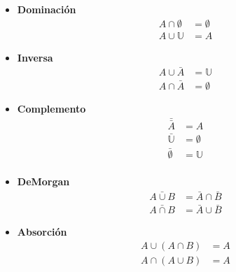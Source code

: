 \begin{itemize}
\item \textbf{Dominación}
\begin{equation}
    \begin{array}{ll}
        A \cap \emptyset & = \emptyset \\
        A \cup \mathbb{U} & = A
    \end{array}
\end{equation}

\item \textbf{Inversa}
\begin{equation}
    \begin{array}{ll}
        A \cup \bar{A} & = \mathbb U \\
        A \cap \bar{A} & = \emptyset
    \end{array}
\end{equation}

\item \textbf{Complemento}
\begin{equation}
    \begin{array}{ll}
        \bar{\bar{A}} & = A \\
        \bar{\mathbb U} & = \emptyset \\
        \bar{\emptyset} & = \mathbb U \\
    \end{array}
\end{equation}

\item \textbf{DeMorgan}
\begin{equation}
    \begin{array}{ll}
        \bar{A \cup B} & = \bar{A} \cap \bar{B} \\
        \bar{A \cap B} & = \bar{A} \cup \bar{B}
    \end{array}
\end{equation}

\item \textbf{Absorción}
\begin{equation}
    \begin{array}{ll}
        A \cup (A \cap B) & = A \\
        A \cap (A \cup B) & = A
    \end{array}
\end{equation}

\end{itemize}

